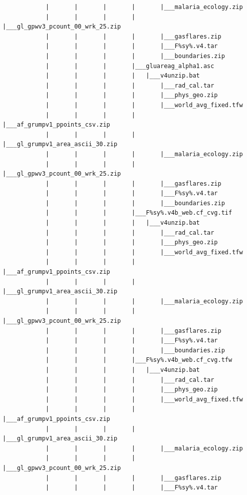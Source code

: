 \documentclass[
]{book}
\begin{document}
\begin{verbatim}
            |       |       |       |       |___malaria_ecology.zip
            |       |       |       |       |___gl_gpwv3_pcount_00_wrk_25.zip
            |       |       |       |       |___gasflares.zip
            |       |       |       |       |___F%sy%.v4.tar
            |       |       |       |       |___boundaries.zip
            |       |       |       |___gluareag_alpha1.asc
            |       |       |       |   |___v4unzip.bat
            |       |       |       |       |___rad_cal.tar
            |       |       |       |       |___phys_geo.zip
            |       |       |       |       |___world_avg_fixed.tfw
            |       |       |       |       |___af_grumpv1_ppoints_csv.zip
            |       |       |       |       |___gl_grumpv1_area_ascii_30.zip
            |       |       |       |       |___malaria_ecology.zip
            |       |       |       |       |___gl_gpwv3_pcount_00_wrk_25.zip
            |       |       |       |       |___gasflares.zip
            |       |       |       |       |___F%sy%.v4.tar
            |       |       |       |       |___boundaries.zip
            |       |       |       |___F%sy%.v4b_web.cf_cvg.tif
            |       |       |       |   |___v4unzip.bat
            |       |       |       |       |___rad_cal.tar
            |       |       |       |       |___phys_geo.zip
            |       |       |       |       |___world_avg_fixed.tfw
            |       |       |       |       |___af_grumpv1_ppoints_csv.zip
            |       |       |       |       |___gl_grumpv1_area_ascii_30.zip
            |       |       |       |       |___malaria_ecology.zip
            |       |       |       |       |___gl_gpwv3_pcount_00_wrk_25.zip
            |       |       |       |       |___gasflares.zip
            |       |       |       |       |___F%sy%.v4.tar
            |       |       |       |       |___boundaries.zip
            |       |       |       |___F%sy%.v4b_web.cf_cvg.tfw
            |       |       |       |   |___v4unzip.bat
            |       |       |       |       |___rad_cal.tar
            |       |       |       |       |___phys_geo.zip
            |       |       |       |       |___world_avg_fixed.tfw
            |       |       |       |       |___af_grumpv1_ppoints_csv.zip
            |       |       |       |       |___gl_grumpv1_area_ascii_30.zip
            |       |       |       |       |___malaria_ecology.zip
            |       |       |       |       |___gl_gpwv3_pcount_00_wrk_25.zip
            |       |       |       |       |___gasflares.zip
            |       |       |       |       |___F%sy%.v4.tar

\end{verbatim}
\end{document}
